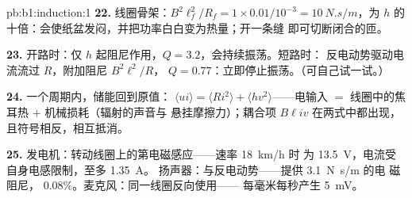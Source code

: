 \begin{solution}{pb:b1:induction:1}
\textbf{22.} 线圈骨架：$B^2\ell_f^2/R_f = 1 \times 0.01/10^{-3} = \qty{10}{N.s/m}$，为
$h$ 的十倍：会使纸盆发闷，并把功率白白变为热量；开一条缝
即可切断闭合的匝。

\textbf{23.} 开路时：仅 $h$ 起阻尼作用，$Q = 3.2$，会持续振荡。短路时：
反电动势驱动电流流过 $R$，附加阻尼 $B^2\ell^2/R$，
$Q = 0.77$：立即停止振荡。（可自己试一试。）

\textbf{24.} 一个周期内，储能回到原值：
$\langle ui\rangle = \langle Ri^2\rangle + \langle hv^2\rangle$——电输入 $=$
线圈中的焦耳热 $+$ 机械损耗（辐射的声音与
悬挂摩擦力）；耦合项 $B\ell iv$ 在两式中都出现，
且符号相反，相互抵消。

\textbf{25.} 发电机：转动线圈上的第电磁感应——速率 \qty{18}{km/h} 时
为 \qty{13.5}{V}，电流受自身电感限制，至多 \qty{1.35}{A}。
扬声器：与反电动势——提供 \qty{3.1}{N.s/m} 的电
磁阻尼， $0.08\%$。麦克风：同一线圈反向使用——
每毫米每秒产生 \qty{5}{mV}。
\end{solution}
